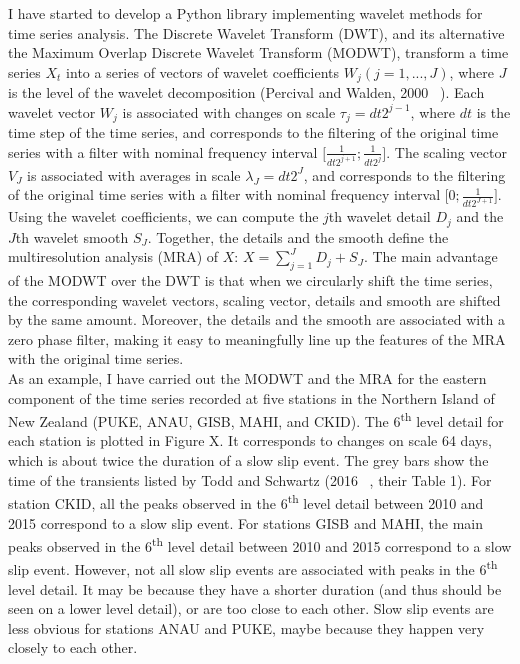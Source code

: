 \documentclass[letterpaper, 12pt]{article}
\begin{document}
I have started to develop a Python library implementing wavelet methods for time series analysis. The Discrete Wavelet Transform (DWT), and its alternative the Maximum Overlap Discrete Wavelet Transform (MODWT), transform a time series $X_t$ into a series of vectors of wavelet coefficients $W_j \left(  j= 1 , ... , J \right)$, where $J$ is the level of the wavelet decomposition (Percival and Walden, 2000 ~\cite{PER_2000}). Each wavelet vector $W_j$ is associated with changes on scale $\tau_j = dt 2^{j - 1}$, where $dt$ is the time step of the time series, and corresponds to the filtering of the original time series with a filter with nominal frequency interval $\lbrack \frac{1}{dt 2^{j + 1}} ; \frac{1}{dt 2^j} \rbrack$. The scaling vector $V_J$ is associated with averages in scale $\lambda_J = dt 2^J$, and corresponds to the filtering of the original time series with a filter with nominal frequency interval $\lbrack 0 ; \frac{1}{dt 2^{J + 1}} \rbrack$. Using the wavelet coefficients, we can compute the $j$th wavelet detail $D_j$ and the $J$th wavelet smooth $S_J$. Together, the details and the smooth define the multiresolution analysis (MRA) of $X$: $X = \sum_{j = 1}^{J} D_j + S_J$. The main advantage of the MODWT over the DWT is that when we circularly shift the time series, the corresponding wavelet vectors, scaling vector, details and smooth are shifted by the same amount. Moreover, the details and the smooth are associated with a zero phase filter, making it easy to meaningfully line up the features of the MRA with the original time series. \\

As an example, I have carried out the MODWT and the MRA for the eastern component of the time series recorded at five stations in the Northern Island of New Zealand (PUKE, ANAU, GISB, MAHI, and CKID). The 6\textsuperscript{th} level detail for each station is plotted in Figure X. It corresponds to changes on scale 64 days, which is about twice the duration of a slow slip event. The grey bars show the time of the transients listed by Todd and Schwartz (2016 ~\cite{TOD_2016}, their Table 1). For station CKID, all the peaks observed in the 6\textsuperscript{th} level detail between 2010 and 2015 correspond to a slow slip event. For stations GISB and MAHI, the main peaks observed in the 6\textsuperscript{th} level detail between 2010 and 2015 correspond to a slow slip event. However, not all slow slip events are associated with peaks in the 6\textsuperscript{th} level detail. It may be because they have a shorter duration (and thus should be seen on a lower level detail), or are too close to each other. Slow slip events are less obvious for stations ANAU and PUKE, maybe because they happen very closely to each other. \\
\end{document}
